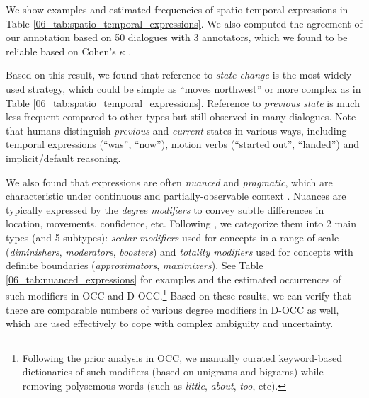 We show examples and estimated frequencies of spatio-temporal expressions in Table \ref{06_tab:spatio_temporal_expressions}. We also computed the agreement of our annotation based on 50 dialogues with 3 annotators, which we found to be reliable based on Cohen's $\kappa$ \citep{cohen1968weighted}.

Based on this result, we found that reference to \textit{state change} is the most widely used strategy, which could be simple as ``moves northwest'' or more complex as in Table \ref{06_tab:spatio_temporal_expressions}. Reference to \textit{previous state} is much less frequent compared to other types but still observed in many dialogues. Note that humans distinguish \textit{previous} and \textit{current} states in various ways, including temporal expressions (``was'', ``now''), motion verbs (``started out'', ``landed'') and implicit/default reasoning.

We also found that expressions are often \textit{nuanced} and \textit{pragmatic}, which are characteristic under continuous and partially-observable context \citep{udagawa2019natural}. 
Nuances are typically expressed by the \textit{degree modifiers} to convey subtle differences in location, movements, confidence, etc. Following \citet{paradis_2008}, we categorize them into 2 main types (and 5 subtypes): \textit{scalar modifiers} used for concepts in a range of scale (\textit{diminishers}, \textit{moderators}, \textit{boosters}) and \textit{totality modifiers} used for concepts with definite boundaries (\textit{approximators}, \textit{maximizers}). See Table \ref{06_tab:nuanced_expressions} for examples and the estimated occurrences of such modifiers in OCC and D-OCC.\footnote{Following the prior analysis in OCC, we manually curated keyword-based dictionaries of such modifiers (based on unigrams and bigrams) while removing polysemous words (such as \textit{little}, \textit{about}, \textit{too}, etc).} Based on these results, we can verify that there are comparable numbers of various degree modifiers in D-OCC as well, which are used effectively to cope with complex ambiguity and uncertainty.

